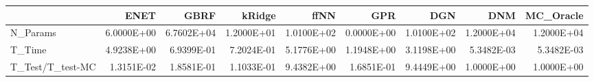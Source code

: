 \begin{tabular}{lrrrrrrrr}
\toprule
{} &       ENET &       GBRF &     kRidge &       ffNN &        GPR &        DGN &        DNM &  MC\_Oracle \\
\midrule
N\_Params         & 6.0000E+00 & 6.7602E+04 & 1.2000E+01 & 1.0100E+02 & 0.0000E+00 & 1.0100E+02 & 1.2000E+04 & 1.2000E+04 \\
T\_Time           & 4.9238E+00 & 6.9399E-01 & 7.2024E-01 & 5.1776E+00 & 1.1948E+00 & 3.1198E+00 & 5.3482E-03 & 5.3482E-03 \\
T\_Test/T\_test-MC & 1.3151E-02 & 1.8581E-01 & 1.1033E-01 & 9.4382E+00 & 1.6851E-01 & 9.4449E+00 & 1.0000E+00 & 1.0000E+00 \\
\bottomrule
\end{tabular}
